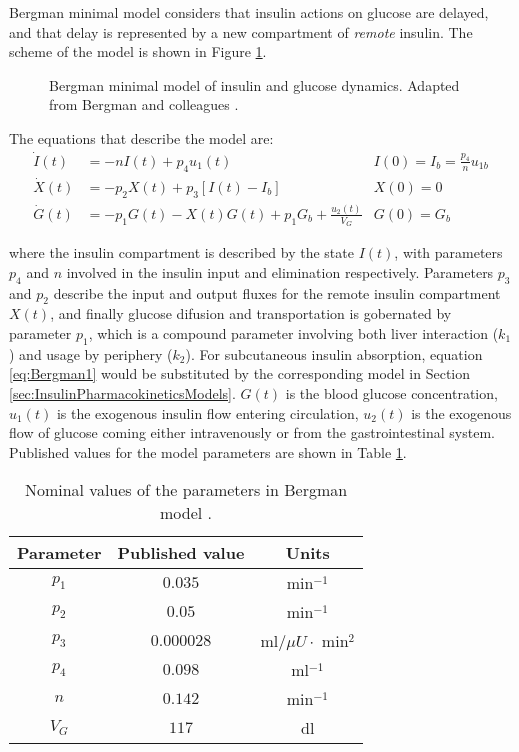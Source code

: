 Bergman minimal model considers that insulin actions on glucose are delayed, and that delay is represented by a new compartment of \textit{remote} insulin. The scheme of the model is shown in Figure \ref{fig:bergman1}.

\begin{figure}[hbtp]
\centering
{}\caption{Bergman minimal model of insulin and glucose dynamics. Adapted from Bergman and colleagues \cite{bergman1981physiologic}.}
\label{fig:bergman1}
\end{figure}

The equations that describe the model are:
\begin{align}
  \dot{I}(t) &= -nI(t)+p_{4}u_{1}(t) & I(0)=I_{b}=\frac{p_{4}}{n}u_{1b} \label{eq:Bergman1}\\
  \dot{X}(t) &= -p_{2}X(t)+p_{3}[I(t)-I_{b}] & X(0)=0 \label{eq:Bergman2}\\
  \dot{G}(t) &= -p_{1}G(t)-X(t)G(t)+p_{1}G_{b} + \frac{u_{2}(t)}{V_{G}} & G(0)=G_{b} \label{eq:Bergman3}
\end{align}

where the insulin compartment is described by the state $I(t)$, with parameters $p_4$ and $n$ involved in the insulin input and elimination respectively. Parameters $p_3$ and $p_2$ describe the input and output fluxes for the remote insulin compartment $X(t)$, and finally glucose difusion and transportation is gobernated by parameter $p_1$, which is a compound parameter involving both liver interaction ($k_1$) and usage by periphery ($k_2$). For subcutaneous insulin absorption, equation \eqref{eq:Bergman1} would be substituted by the corresponding model in Section \ref{sec:InsulinPharmacokineticsModels}. $G(t)$ is the blood glucose concentration, $u_{1}(t)$ is the exogenous insulin flow entering circulation, $u_{2}(t)$ is the exogenous flow of glucose coming either intravenously or from the gastrointestinal system. Published values for the model parameters are shown in Table \ref{tab:Bergman}.

\begin{table}[hbtp]
	\centering
	\begin{tabular}{|c c c|}
	\hline 
	Parameter & Published value & Units \\
	\hline 
	$p_{1}$ & $0.035$ & min$^{-1}$ \\
	$p_{2}$ & $0.05$ & min$^{-1}$ \\
	$p_{3}$ & $0.000028$ & ml$/\mu U\cdot$ min$^{2}$ \\
	$p_{4}$ & $0.098$ & ml$^{-1}$ \\
	$n$ & $0.142$ & min$^{-1}$ \\
	$V_{G}$ & $117$ & dl\\
	\hline
	\end{tabular}
\caption{Nominal values of the parameters in Bergman model \cite{roy2007dynamic}.}
\label{tab:Bergman}
\end{table}


